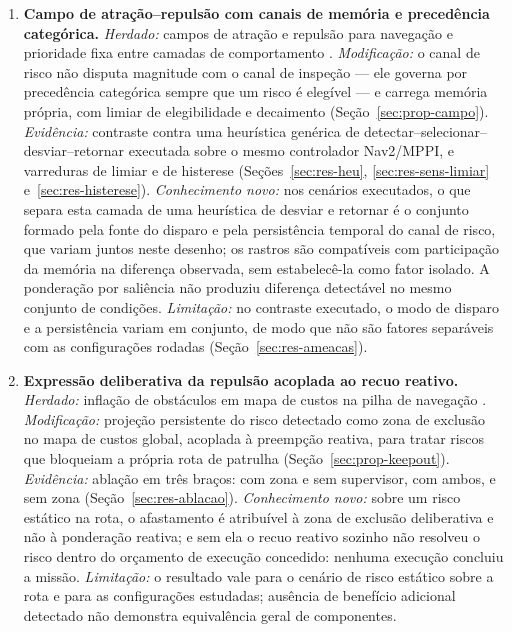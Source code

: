 \begin{enumerate}
    \item \textbf{Campo de atração--repulsão com canais de memória e precedência
    categórica.} \emph{Herdado:} campos de atração e repulsão para navegação
    \cite{Arkin1989,Barraquand1992} e prioridade fixa entre camadas de comportamento
    \cite{Brooks1986}. \emph{Modificação:} o canal de risco não disputa magnitude com
    o canal de inspeção --- ele governa por precedência categórica sempre que um risco
    é elegível --- e carrega memória própria, com limiar de elegibilidade e decaimento
    (Seção~\ref{sec:prop-campo}). \emph{Evidência:} contraste contra uma heurística
    genérica de detectar--selecionar--desviar--retornar executada sobre o mesmo
    controlador Nav2/MPPI, e varreduras de limiar e de histerese
    (Seções~\ref{sec:res-heu}, \ref{sec:res-sens-limiar} e~\ref{sec:res-histerese}).
    \emph{Conhecimento novo:} nos cenários executados, o que separa esta camada de uma
    heurística de desviar e retornar é o conjunto formado pela fonte do disparo e pela
    persistência temporal do canal de risco, que variam juntos neste desenho; os
    rastros são compatíveis com participação da memória na diferença observada, sem
    estabelecê-la como fator isolado. A ponderação por saliência não produziu diferença
    detectável no mesmo conjunto de condições. \emph{Limitação:} no contraste executado, o modo de disparo e a
    persistência variam em conjunto, de modo que não são fatores separáveis com as
    configurações rodadas (Seção~\ref{sec:res-ameacas}).

    \item \textbf{Expressão deliberativa da repulsão acoplada ao recuo reativo.}
    \emph{Herdado:} inflação de obstáculos em mapa de custos na pilha de navegação
    \cite{Macenski2020Marathon}. %
    \emph{Modificação:} projeção persistente do risco detectado
    como zona de exclusão no mapa de custos global, acoplada à preempção reativa, para
    tratar riscos que bloqueiam a própria rota de patrulha
    (Seção~\ref{sec:prop-keepout}). \emph{Evidência:} ablação em três braços: com
    zona e sem supervisor, com ambos, e sem zona (Seção~\ref{sec:res-ablacao}).
    \emph{Conhecimento novo:} sobre um risco estático na rota, o afastamento é
    atribuível à zona de exclusão deliberativa e não à ponderação reativa; e sem ela o
    recuo reativo sozinho não resolveu o risco dentro do orçamento de execução concedido: nenhuma execução concluiu a missão. \emph{Limitação:} o resultado vale para o
    cenário de risco estático sobre a rota e para as configurações estudadas; ausência
    de benefício adicional detectado não demonstra equivalência geral de componentes.


\end{enumerate}
